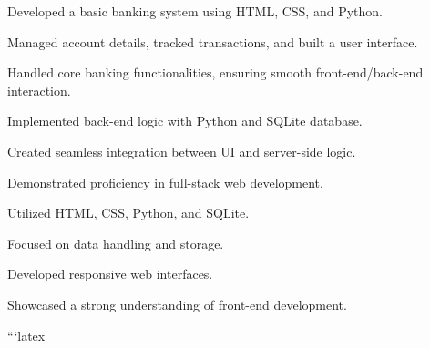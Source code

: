    \begin{onecolentry}
        \begin{highlights}
            \item Developed a basic banking system using HTML, CSS, and Python.
            \item Managed account details, tracked transactions, and built a user interface.
            \item Handled core banking functionalities, ensuring smooth front-end/back-end interaction.
            \item Implemented back-end logic with Python and SQLite database.
            \item Created seamless integration between UI and server-side logic.  
            \item Demonstrated proficiency in full-stack web development.
            \item Utilized  HTML, CSS, Python, and SQLite.
            \item Focused on data handling and storage.
            \item Developed responsive web interfaces.
            \item Showcased a strong understanding of front-end development.

        \end{highlights}
    \end{onecolentry}


```latex
